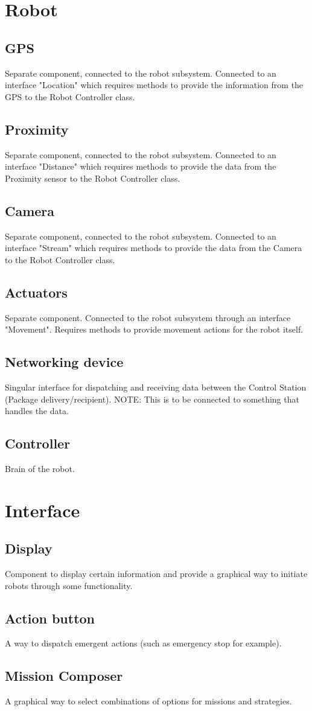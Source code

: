 \section{Robot}
\subsection{GPS}
Separate component, connected to the robot subsystem. Connected to an interface "Location" which requires methods to provide the information from the GPS to the Robot Controller class.
\subsection{Proximity}
Separate component, connected to the robot subsystem. Connected to an interface "Distance" which requires methods to provide the data from the Proximity sensor to the Robot Controller class.
\subsection{Camera}
Separate component, connected to the robot subsystem. Connected to an interface "Stream" which requires methods to provide the data from the Camera to the Robot Controller class.
\subsection{Actuators}
Separate component. Connected to the robot subsystem through an interface "Movement". Requires methods to provide movement actions for the robot itself.
\subsection{Networking device}
Singular interface for dispatching and receiving data between the Control Station (Package delivery/recipient). NOTE: This is to be connected to something that handles the data.

\subsection{Controller}
Brain of the robot.

\section{Interface}
\subsection{Display}
Component to display certain information and provide a graphical way to initiate robots through some functionality.
\subsection{Action button}
A way to dispatch emergent actions (such as emergency stop for example).
\subsection{Mission Composer}
A graphical way to select combinations of options for missions and strategies.
\subsection{}